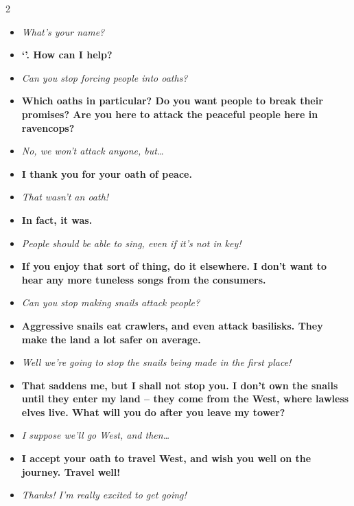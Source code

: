 \begin{multicols}{2}
\begin{itemize}
  \item\it
  What's your name?
  \item[\adforn{54}]\bf
  `'.
  How can I help?
  \item\it
  Can you stop forcing people into oaths?
  \item[\adforn{54}]\bf
  Which oaths in particular?
  Do you want people to break their promises?
  Are you here to attack the peaceful people here in \gls{ravencops}?
  \item\it
  No, we won't attack anyone, but\ldots
  \item[\adforn{54}]\bf
  I thank you for your oath of peace.
  \item\it
  That wasn't an oath!
  \item[\adforn{54}]\bf
  In fact, it was.
  \item\it
  People should be able to sing, even if it's not in key!
  \item[\adforn{54}]\bf
  If you enjoy that sort of thing, do it elsewhere.
  I don't want to hear any more tuneless songs from the \glspl{consumer}.
  \item\it
  Can you stop making snails attack people?
  \item[\adforn{54}]\bf
  Aggressive snails eat \glspl{crawler}, and even attack \glspl{basilisk}.
  They make the land a lot safer on average.
  \item\it
  Well we're going to stop the snails being made in the first place!
  \item[\adforn{54}]\bf
  That saddens me, but I shall not stop you.
  I don't own the snails until they enter my land -- they come from the West, where lawless elves live.
  What will you do after you leave my tower?
  \item\it
  I suppose we'll go West, and then\ldots
  \item[\adforn{54}]\bf
  I accept your oath to travel West, and wish you well on the journey.
  Travel well!
  \item\it
  Thanks!
  I'm really excited to get going!
\end{itemize}

\MindElder

\showStdSpells[
  
  \politeSpell
  
  \setcounter{diceNo}{0}
  
]

\label{oathlessLovers}


\end{multicols}
